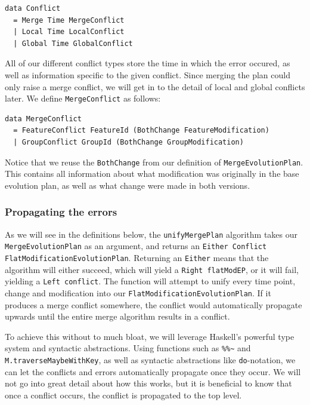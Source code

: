 \documentclass[a4paper,english]{ifimaster}
\begin{document}
\begin{verbatim}
data Conflict
  = Merge Time MergeConflict
  | Local Time LocalConflict
  | Global Time GlobalConflict
\end{verbatim}

All of our different conflict types store the time in which the error occured, as well as information specific to the given conflict. Since merging the plan could only raise a merge conflict, we will get in to the detail of local and global conflicts later. We define \texttt{MergeConflict} as follows:

\begin{verbatim}
data MergeConflict
  = FeatureConflict FeatureId (BothChange FeatureModification)
  | GroupConflict GroupId (BothChange GroupModification)
\end{verbatim}

Notice that we reuse the \texttt{BothChange} from our definition of \texttt{Merge\-Evolution\-Plan}. This contains all information about what modification was originally in the base evolution plan, as well as what change were made in both versions.

\subsubsection{Propagating the errors}%
\label{ssub:propagating_the_errors}

As we will see in the definitions below, the \texttt{unify\-Merge\-Plan} algorithm takes our \texttt{Merge\-Evolution\-Plan} as an argument, and returns an \texttt{Either Conflict Flat\-Modification\-Evolution\-Plan}. Returning an \texttt{Either} means that the algorithm will either succeed, which will yield a \texttt{Right flatModEP}, or it will fail, yielding a \texttt{Left conflict}. The function will attempt to unify every time point, change and modification into our \texttt{Flat\-Modification\-Evolution\-Plan}. If it produces a merge conflict somewhere, the conflict would automatically propagate upwards until the entire merge algorithm results in a conflict.

To achieve this without to much bloat, we will leverage Haskell's powerful type system and syntactic abstractions. Using functions such as \texttt{\%\%\~} and \texttt{M.traverseMaybeWithKey}, as well as syntactic abstractions like \texttt{do}-notation, we can let the conflicts and errors automatically propagate once they occur. We will not go into great detail about how this works, but it is beneficial to know that once a conflict occurs, the conflict is propagated to the top level.
\end{document}
